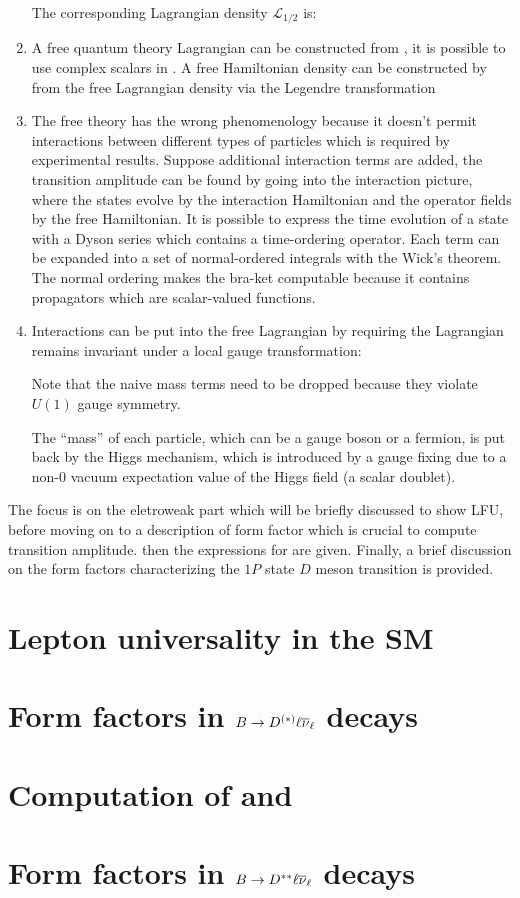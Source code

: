 \begin{enumerate}
        The corresponding Lagrangian density $\mathcal{L}_{1/2}$ is:

    \item A free quantum theory Lagrangian can be constructed from ,
        it is possible to use complex scalars in .
        A free Hamiltonian density can be constructed by from the free
        Lagrangian density via the Legendre transformation

    \item The free theory has the wrong phenomenology because it doesn't permit
        interactions between different types of particles which is required by
        experimental results.
        Suppose additional interaction terms are added,
        the transition amplitude can be found by going into the interaction
        picture, where the states evolve by the interaction Hamiltonian
        and the operator fields by the free Hamiltonian.
        It is possible to express the time evolution of a state with a Dyson
        series which contains a time-ordering operator.
        Each term can be expanded into a set of normal-ordered integrals with
        the Wick's theorem.
        The normal ordering makes the bra-ket computable because it contains
        propagators which are scalar-valued functions.

    \item Interactions can be put into the free Lagrangian by requiring the
        Lagrangian remains invariant under a local gauge transformation:

        Note that the naive mass terms need to be dropped because they violate
        $U(1)$ gauge symmetry.

        The ``mass'' of each particle, which can be a gauge boson or a fermion,
        is put back by the Higgs mechanism,
        which is introduced by a gauge fixing due to a non-0 vacuum expectation
        value of the Higgs field (a scalar doublet).
\end{enumerate}

The focus is on the eletroweak part which will be briefly discussed to show LFU,
before moving on to a description of form factor which is crucial to compute
transition amplitude.
then the expressions for \RDX are given.
Finally, a brief discussion on the form factors characterizing the $1P$ state
$D$ meson transition is provided.


\section{Lepton universality in the SM}
\label{ref:theory:lfu}


\section{Form factors in $B \rightarrow D^{(*)}\ell{\ensuremath{{\overline{\nu}}_\ell}}$ decays}
\label{ref:theory:ff-d0-dst}


\section{Computation of \RD and \RDst}
\label{ref:theory:rdx}


\section{Form factors in $B \rightarrow D^{**}\ell{\ensuremath{{\overline{\nu}}_\ell}}$ decays}
\label{ref:theory:ff-dstst}
